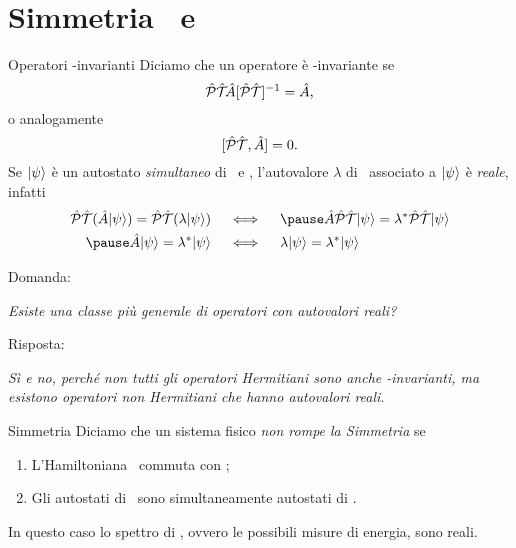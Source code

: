 \section{Simmetria \PT\ e \CPT}
\begin{frame}{Operatori \PT-invarianti}
    Diciamo che un operatore è \hPT-invariante se
    $$\PTtransform{\hA} = \hA\mycomma$$
    o analogamente
    $$\comm*{\hPT}{\hA}\! = 0\myperiod$$
    \pause
    Se $\ket{\psi}$ è un autostato \emph{simultaneo} di \hA\ e \hPT, l'autovalore $\lambda$ di \hA\ associato a $\ket{\psi}$ è \emph{reale}, infatti
    \begin{align*} 
        \hPT\pqty*{\hA\!\ket{\psi}}\! = \hPT\pqty{\lambda\!\ket{\psi}}
        \quad&\iff\quad
        \pause
        \hA\hPT\!\ket{\psi} = \lambda^*\hPT\!\ket{\psi} \\
        \pause
        \hA\!\ket{\psi} = \lambda^*\!\ket{\psi}
        \quad&\iff\quad
        \lambda\!\ket{\psi} = \lambda^*\!\ket{\psi}
    \end{align*}
\end{frame}

\begin{frame}
    Domanda:
    \begin{center}
        {\it Esiste una classe più generale di operatori con autovalori reali?}
    \end{center}
    Risposta:
    \pause
    \begin{center}
        {\it Sì e no, perché non tutti gli operatori Hermitiani sono \emph{anche} \PT-invarianti, ma esistono operatori \emph{non Hermitiani} che hanno autovalori reali.}
    \end{center}
    \pause
    \begin{figure}
        \centering
    \end{figure}
\end{frame}

\begin{frame}{Simmetria \PT}
    Diciamo che un sistema fisico \emph{non rompe la Simmetria \PT} se
    \begin{enumerate}[label=\mybullet]
        \pause
        \item L'Hamiltoniana \hH\ commuta con \hPT;
        \pause
        \item Gli autostati di \hH\ sono simultaneamente autostati di \hPT.
    \end{enumerate}
    \pause
    In questo caso lo spettro di \hH, ovvero le possibili misure di energia, sono reali.
\end{frame}

